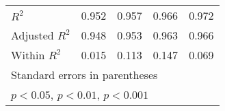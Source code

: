 {\begin{tabular}{l*{4}{c}}
\(R^{2}\)       &    0.952         &    0.957         &    0.966         &    0.972         \\
Adjusted \(R^{2}\)&    0.948         &    0.953         &    0.963         &    0.966         \\
Within \(R^{2}\)&    0.015         &    0.113         &    0.147         &    0.069         \\
\bottomrule
\multicolumn{5}{l}{\footnotesize Standard errors in parentheses}\\
\multicolumn{5}{l}{\footnotesize \sym{*} \(p<0.05\), \sym{**} \(p<0.01\), \sym{***} \(p<0.001\)}\\
\end{tabular}
}
